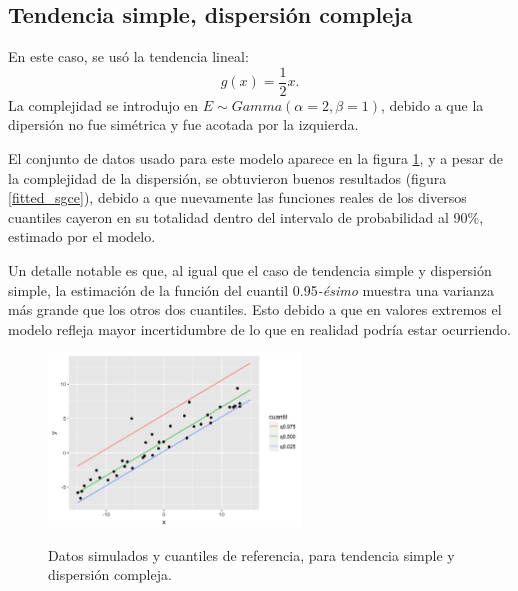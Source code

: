\subsection{Tendencia simple, dispersi\'on compleja}

En este caso, se us\'o la tendencia lineal:
\begin{equation*}
    g(x) = \frac{1}{2} x.
\end{equation*}
La complejidad se introdujo en $E \sim \textit{Gamma}(\alpha = 2,\beta = 1)$, debido a que la dipersi\'on no fue sim\'etrica y fue acotada por la izquierda. 

El conjunto de datos usado para este modelo aparece en la figura \ref{sample_sgce}, y a pesar de la complejidad de la dispersi\'on, se obtuvieron buenos resultados (figura \ref{fitted_sgce}), debido a que nuevamente las funciones reales de los diversos cuantiles cayeron en su totalidad dentro del intervalo de probabilidad al 90\%, estimado por el modelo.

Un detalle notable es que, al igual que el caso de tendencia simple y dispersi\'on simple, la estimaci\'on de la funci\'on del cuantil 0.95\textit{-\'esimo} muestra una varianza m\'as grande que los otros dos cuantiles. Esto debido a que en valores extremos el modelo refleja mayor incertidumbre de lo que en realidad podr\'ia estar ocurriendo.

\begin{figure}[H]
	\centering
	\caption{Datos simulados y cuantiles de referencia, para tendencia simple y dispersi\'on compleja.}
	\includegraphics[width=0.60\textwidth]{Figures/Simulation/simple_g_complex_error/sample.png}
	\label{sample_sgce}
\end{figure}

